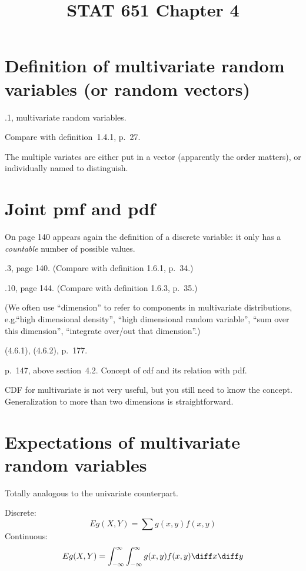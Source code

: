 \documentclass[12pt]{article}
\begin{document}
\title{STAT 651 Chapter 4}
\maketitle

\section{Definition of multivariate random variables (or random
vectors)}

.1, multivariate random variables.

Compare with definition~1.4.1, p.~27.

The multiple variates are either put in a vector (apparently the order
matters), or individually named to distinguish.

\section{Joint pmf and pdf}

On page 140 appears again the definition of a discrete variable:
it only has a \emph{countable} number of possible values.

.3, page 140. (Compare with definition 1.6.1, p.~34.)

.10, page 144. (Compare with definition 1.6.3, p.~35.)


(We often use ``dimension'' to refer to components in
multivariate distributions, e.g.\@ ``high dimensional density'',
``high dimensional random variable'',
``sum over this dimension'',
``integrate over/out that dimension''.)

\alert[Generalization]%
(4.6.1), (4.6.2), p.~177.

\alert[cdf]%
p.~147, above section~4.2.
Concept of cdf and its relation with pdf.

CDF for multivariate is not very useful, but you still need to know the
concept.
Generalization to more than two dimensions is straightforward.


\section{Expectations of multivariate random variables}

Totally analogous to the univariate counterpart.

Discrete:
\[
Eg(X, Y) = \sum g(x,y) f(x,y)
\]
Continuous:
\[
Eg(X,Y) = \int_{-\infty}^{\infty} \int_{-\infty}^{\infty}
    g(x,y) f(x,y) \diff x \diff y
\]
\end{document}
